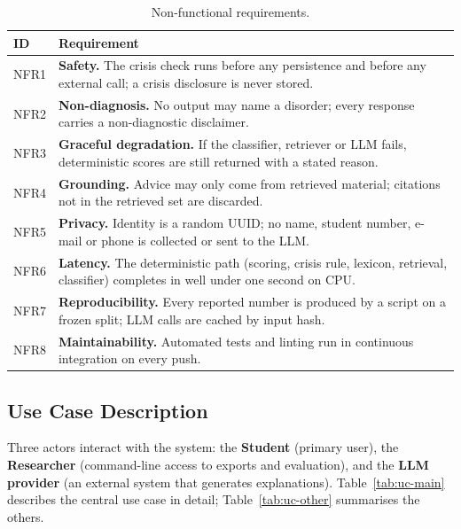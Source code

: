 \begin{table}[ht]
	\centering
	\caption{Non-functional requirements.}
	\label{tab:nfr}
	\begin{tabularx}{\textwidth}{lL}
		\toprule
		ID   & Requirement \\ \midrule
		NFR1 & \textbf{Safety.} The crisis check runs before any persistence and before any external call; a crisis disclosure is never stored. \\
		NFR2 & \textbf{Non-diagnosis.} No output may name a disorder; every response carries a non-diagnostic disclaimer. \\
		NFR3 & \textbf{Graceful degradation.} If the classifier, retriever or LLM fails, deterministic scores are still returned with a stated reason. \\
		NFR4 & \textbf{Grounding.} Advice may only come from retrieved material; citations not in the retrieved set are discarded. \\
		NFR5 & \textbf{Privacy.} Identity is a random UUID; no name, student number, e-mail or phone is collected or sent to the LLM. \\
		NFR6 & \textbf{Latency.} The deterministic path (scoring, crisis rule, lexicon, retrieval, classifier) completes in well under one second on CPU. \\
		NFR7 & \textbf{Reproducibility.} Every reported number is produced by a script on a frozen split; LLM calls are cached by input hash. \\
		NFR8 & \textbf{Maintainability.} Automated tests and linting run in continuous integration on every push. \\ \bottomrule
	\end{tabularx}
\end{table}

\subsection{Use Case Description}
Three actors interact with the system: the \textbf{Student} (primary user), the \textbf{Researcher} (command-line access to exports and evaluation), and the \textbf{LLM provider} (an external system that generates explanations). Table~\ref{tab:uc-main} describes the central use case in detail; Table~\ref{tab:uc-other} summarises the others.


